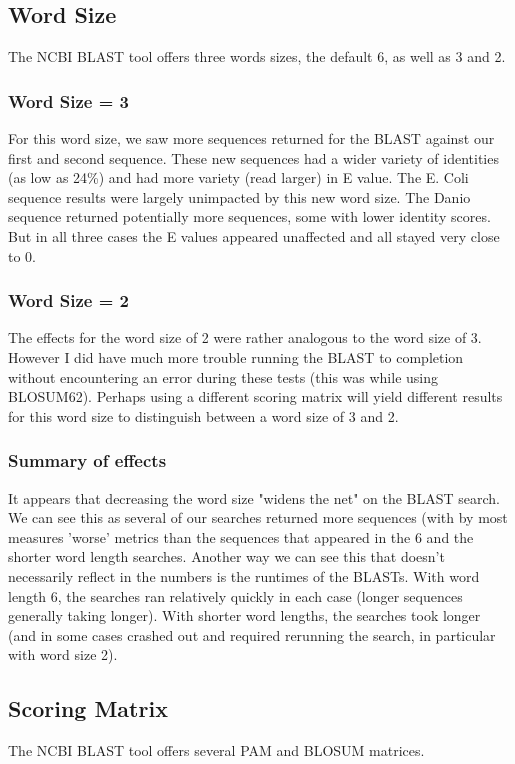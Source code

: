 \documentclass[12pt, oneside]{article}
\begin{document}
\subsection*{Word Size}
The NCBI BLAST tool offers three words sizes, the default 6, as well as 3 and 2.
\subsubsection*{Word Size = 3}
For this word size, we saw more sequences returned for the BLAST against our first and second sequence. These new sequences had a wider variety of identities (as low as 24\%) and had more variety (read larger) in E value. The E. Coli sequence results were largely unimpacted by this new word size. The Danio sequence returned potentially more sequences, some with lower identity scores. But in all three cases the E values appeared unaffected and all stayed very close to 0.
\subsubsection*{Word Size = 2}
The effects for the word size of 2 were rather analogous to the word size of 3. However I did have much more trouble running the BLAST to completion without encountering an error during these tests (this was while using BLOSUM62). Perhaps using a different scoring matrix will yield different results for this word size to distinguish between a word size of 3 and 2.

\subsubsection*{Summary of effects}
It appears that decreasing the word size "widens the net" on the BLAST search. We can see this as several of our searches returned more sequences (with by most measures 'worse' metrics than the sequences that appeared in the 6 and the shorter word length searches. Another way we can see this that doesn't necessarily reflect in the numbers is the runtimes of the BLASTs. With word length 6, the searches ran relatively quickly in each case (longer sequences generally taking longer). With shorter word lengths, the searches took longer (and in some cases crashed out and required rerunning the search, in particular with word size 2).

\subsection*{Scoring Matrix} 
The NCBI BLAST tool offers several PAM and BLOSUM matrices. 
\end{document}
